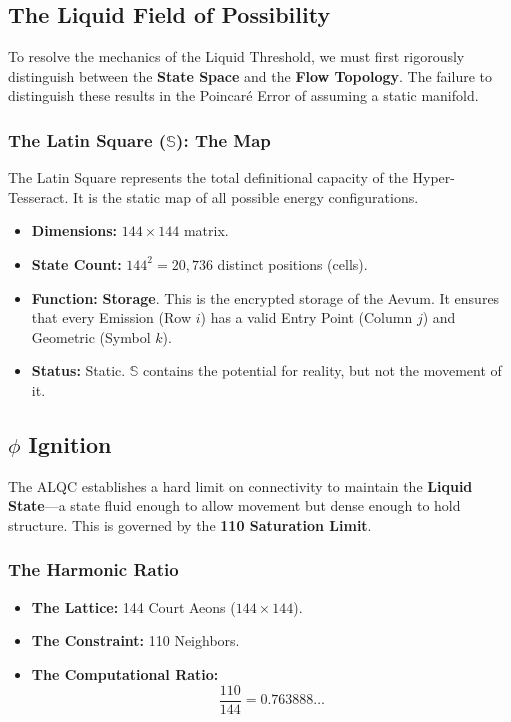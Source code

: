 \documentclass[11pt, letterpaper]{article}
\begin{document}
\subsection{The Liquid Field of Possibility}\label{appendixF.1}

To resolve the mechanics of the Liquid Threshold, we must first rigorously distinguish between the \textbf{State Space} and the \textbf{Flow Topology}. The failure to distinguish these results in the Poincaré Error of assuming a static manifold.

\subsubsection{The Latin Square (\protect\boldmath$\mathbb{S}$): The Map}\label{appendixF.1.1}
The Latin Square represents the total definitional capacity of the Hyper-Tesseract. It is the static map of all possible energy configurations.

\begin{itemize}
    \item \textbf{Dimensions:} $144 \times 144$ matrix.
    \item \textbf{State Count:} $144^2 = 20,736$ distinct positions (cells).
    \item \textbf{Function:} \textbf{Storage}. This is the encrypted storage of the Aevum. It ensures that every Emission (Row $i$) has a valid Entry Point (Column $j$) and Geometric (Symbol $k$).
    \item \textbf{Status:} Static. $\mathbb{S}$ contains the potential for reality, but not the movement of it.
\end{itemize}

\subsection[Phi Ignition]{$\phi$ Ignition}\label{appendixF.2}

The ALQC establishes a hard limit on connectivity to maintain the \textbf{Liquid State}---a state fluid enough to allow movement but dense enough to hold structure. This is governed by the \textbf{110 Saturation Limit}.

\subsubsection{The Harmonic Ratio}\label{appendixF.2.1}  
\begin{itemize}
    \item \textbf{The Lattice:} 144 Court Aeons ($144 \times 144$).
    \item \textbf{The Constraint:} 110 Neighbors.
    \item \textbf{The Computational Ratio:}
    \begin{equation}
        \frac{110}{144} = 0.763888\dots
    \end{equation}
\end{itemize}
\end{document}
